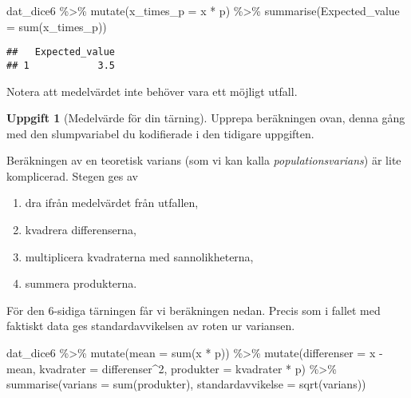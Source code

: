 \documentclass[
]{book}
\newenvironment{Shaded}{\begin{snugshade}}{\end{snugshade}}
\newcommand{\AttributeTok}[1]{\textcolor[rgb]{0.77,0.63,0.00}{#1}}
\newcommand{\DecValTok}[1]{\textcolor[rgb]{0.00,0.00,0.81}{#1}}
\newcommand{\FunctionTok}[1]{\textcolor[rgb]{0.00,0.00,0.00}{#1}}
\newcommand{\NormalTok}[1]{#1}
\newcommand{\SpecialCharTok}[1]{\textcolor[rgb]{0.00,0.00,0.00}{#1}}
\providecommand{\tightlist}{%
  \setlength{\itemsep}{0pt}\setlength{\parskip}{0pt}}
\theoremstyle{definition}
\theoremstyle{definition}
\theoremstyle{definition}
\newtheorem{exercise}{Uppgift}[chapter]
\theoremstyle{definition}
\theoremstyle{remark}
\begin{document}
\begin{Shaded}
\begin{Highlighting}[]
\NormalTok{dat\_dice6 }\SpecialCharTok{\%\textgreater{}\%} 
  \FunctionTok{mutate}\NormalTok{(}\AttributeTok{x\_times\_p =}\NormalTok{ x }\SpecialCharTok{*}\NormalTok{ p) }\SpecialCharTok{\%\textgreater{}\%} 
  \FunctionTok{summarise}\NormalTok{(}\AttributeTok{Expected\_value =} \FunctionTok{sum}\NormalTok{(x\_times\_p))}
\end{Highlighting}
\end{Shaded}

\begin{verbatim}
##   Expected_value
## 1            3.5
\end{verbatim}

Notera att medelvärdet inte behöver vara ett möjligt utfall.

\begin{exercise}[Medelvärde för din tärning]
Upprepa beräkningen ovan, denna gång med den slumpvariabel du kodifierade i den tidigare uppgiften.
\end{exercise}

Beräkningen av en teoretisk varians (som vi kan kalla \emph{populationsvarians}) är lite komplicerad. Stegen ges av

\begin{enumerate}
\def\labelenumi{\arabic{enumi}.}
\tightlist
\item
  dra ifrån medelvärdet från utfallen,
\item
  kvadrera differenserna,
\item
  multiplicera kvadraterna med sannolikheterna,
\item
  summera produkterna.
\end{enumerate}

För den 6-sidiga tärningen får vi beräkningen nedan. Precis som i fallet med faktiskt data ges standardavvikelsen av roten ur variansen.

\begin{Shaded}
\begin{Highlighting}[]
\NormalTok{dat\_dice6 }\SpecialCharTok{\%\textgreater{}\%} 
  \FunctionTok{mutate}\NormalTok{(}\AttributeTok{mean =} \FunctionTok{sum}\NormalTok{(x }\SpecialCharTok{*}\NormalTok{ p)) }\SpecialCharTok{\%\textgreater{}\%} 
  \FunctionTok{mutate}\NormalTok{(}\AttributeTok{differenser =}\NormalTok{ x }\SpecialCharTok{{-}}\NormalTok{ mean,}
         \AttributeTok{kvadrater =}\NormalTok{ differenser}\SpecialCharTok{\^{}}\DecValTok{2}\NormalTok{,}
         \AttributeTok{produkter =}\NormalTok{ kvadrater }\SpecialCharTok{*}\NormalTok{ p) }\SpecialCharTok{\%\textgreater{}\%} 
  \FunctionTok{summarise}\NormalTok{(}\AttributeTok{varians =} \FunctionTok{sum}\NormalTok{(produkter),}
            \AttributeTok{standardavvikelse =} \FunctionTok{sqrt}\NormalTok{(varians))}
\end{Highlighting}
\end{Shaded}
\end{document}
